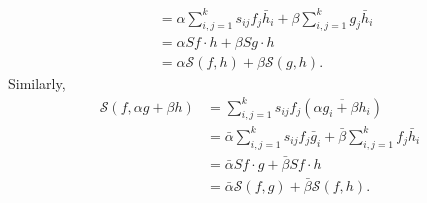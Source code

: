 \documentclass[11pt, oneside, a4paper]{article}
\begin{document}
\begin{rmk}
{\begin{align*}
        &= \alpha \sum_{i,j=1}^k s_{ij}f_j\bar{h}_i + \beta \sum_{i,j=1}^k g_j\bar{h}_i\\
        &= \alpha Sf\cdot h + \beta Sg\cdot h\\
        &= \alpha\mathcal{S}(f,h) + \beta\mathcal{S}(g,h).
    \end{align*}
    Similarly,
    \begin{align*}
        \mathcal{S}(f, \alpha g + \beta h)
        &= \sum_{i,j=1}^k s_{ij}f_j(\overline{\alpha g_i + \beta h_i})\\
        &= \bar{\alpha}\sum_{i,j=1}^k s_{ij}f_j\bar{g}_i + \bar{\beta}\sum_{i,j=1}^k f_j \bar{h}_i\\
        &= \bar{\alpha}Sf\cdot g + \bar{\beta}Sf\cdot h\\
        &= \bar{\alpha}\mathcal{S}(f,g) + \bar{\beta}\mathcal{S}(f,h).
    \end{align*}
    }
\end{rmk}
\end{document}
